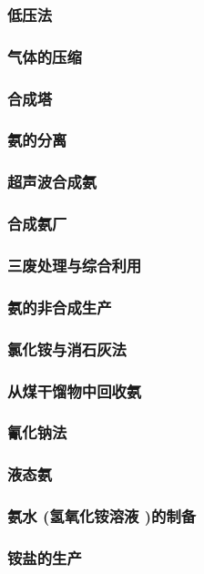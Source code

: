 \documentclass[UTF8]{../../ApplicationUniverse}
\begin{document}
                \subsubsection{低压法}
                \subsubsection{气体的压缩}
                \subsubsection{合成塔}
                \subsubsection{氨的分离}
                \subsubsection{超声波合成氨}
        \subsubsection{合成氨厂}
        \subsubsection{三废处理与综合利用}
    \subsubsection{氨的非合成生产}
        \subsubsection{氯化铵与消石灰法}
        \subsubsection{从煤干馏物中回收氨}
        \subsubsection{氰化钠法}
    \subsubsection{液态氨}
    \subsubsection{氨水 (氢氧化铵溶液 )的制备}
    \subsubsection{铵盐的生产}
\end{document}
